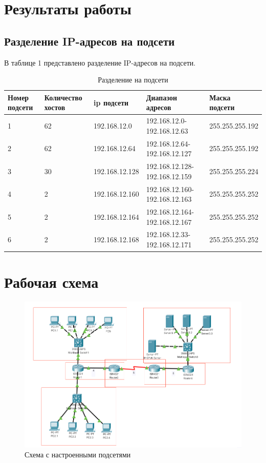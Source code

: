 \documentclass[12pt]{report}
\begin{document}
\section*{Результаты работы}

\subsection*{Разделение IP-адресов на подсети}

В таблице 1 представлено разделение IP-адресов на подсети.

\begin{table}[H]
	\centering
	\label{tab:networks}
	\begin{tabular}{|p{1.5cm}|p{3cm}|p{3cm}|p{3.5cm}|p{3.2cm}|}
		\hline
		Номер подсети & Количество хостов & ip подсети & Диапазон адресов & Маска подсети \\
		\hline
		1 & 62 & 192.168.12.0 & 192.168.12.0-192.168.12.63 & 255.255.255.192 \\
		\hline
		2 & 62 & 192.168.12.64 & 192.168.12.64-192.168.12.127 & 255.255.255.192 \\
		\hline
		3 & 30 & 192.168.12.128 & 192.168.12.128-192.168.12.159 & 255.255.255.224  \\
		\hline
		4 & 2 & 192.168.12.160 & 192.168.12.160-192.168.12.163 & 255.255.255.252  \\
		\hline
		5 & 2 & 192.168.12.164 & 192.168.12.164-192.168.12.167 & 255.255.255.252  \\
		\hline
		6 & 2 & 192.168.12.168 & 192.168.12.33-192.168.12.171 & 255.255.255.252  \\
		\hline
	\end{tabular}
	\caption{Разделение на подсети}
\end{table}

\section*{Рабочая схема}

\begin{figure}[H]
	\begin{center}
		\includegraphics[scale=0.6]{img/1.png}
	\end{center}
	\caption{Схема с настроенными подсетями}
	\label{fig:1}
\end{figure}
\end{document}
